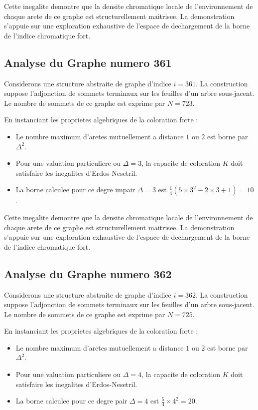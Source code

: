 \documentclass[11pt,a4paper]{article}
\begin{document}
Cette inegalite demontre que la densite chromatique locale de l'environnement de chaque arete de ce graphe est structurellement maitrisee. La demonstration s'appuie sur une exploration exhaustive de l'espace de dechargement de la borne de l'indice chromatique fort.

\subsection{Analyse du Graphe numero 361}
Considerons une structure abstraite de graphe d'indice $i = 361$. La construction suppose l'adjonction de sommets terminaux sur les feuilles d'un arbre sous-jacent. Le nombre de sommets de ce graphe est exprime par $N = 723$.

En instanciant les proprietes algebriques de la coloration forte :
\begin{itemize}
\item Le nombre maximum d'aretes mutuellement a distance $1$ ou $2$ est borne par $\Delta^2$.
\item Pour une valuation particuliere ou $\Delta = 3$, la capacite de coloration $K$ doit satisfaire les inegalites d'Erdos-Nesetril.
\item La borne calculee pour ce degre impair $\Delta = 3$ est $\frac{1}{4}(5 \times 3^2 - 2 \times 3 + 1) = 10$.
\end{itemize}

Cette inegalite demontre que la densite chromatique locale de l'environnement de chaque arete de ce graphe est structurellement maitrisee. La demonstration s'appuie sur une exploration exhaustive de l'espace de dechargement de la borne de l'indice chromatique fort.

\subsection{Analyse du Graphe numero 362}
Considerons une structure abstraite de graphe d'indice $i = 362$. La construction suppose l'adjonction de sommets terminaux sur les feuilles d'un arbre sous-jacent. Le nombre de sommets de ce graphe est exprime par $N = 725$.

En instanciant les proprietes algebriques de la coloration forte :
\begin{itemize}
\item Le nombre maximum d'aretes mutuellement a distance $1$ ou $2$ est borne par $\Delta^2$.
\item Pour une valuation particuliere ou $\Delta = 4$, la capacite de coloration $K$ doit satisfaire les inegalites d'Erdos-Nesetril.
\item La borne calculee pour ce degre pair $\Delta = 4$ est $\frac{5}{4} \times 4^2 = 20$.
\end{itemize}
\end{document}
